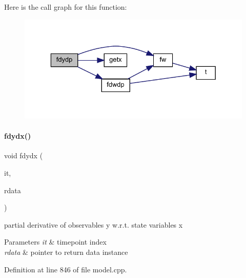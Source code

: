 Here is the call graph for this function\+:
\nopagebreak
\begin{figure}[H]
\begin{center}
\leavevmode
\includegraphics[width=329pt]{classamici_1_1_model_a884ccb083130cb1af7ebe93f7a6d361a_cgraph}
\end{center}
\end{figure}
\mbox{\label{classamici_1_1_model_a3ec46e89aed7bd191fb21ac3e501edd2}} 
\paragraph{\texorpdfstring{fdydx()}{fdydx()}\hspace{0.1cm}{\footnotesize\ttfamily [1/2]}}
{\footnotesize\ttfamily void fdydx (\begin{DoxyParamCaption}\item[{const int}]{it,  }\item[{\mbox{\hyperlink{classamici_1_1_return_data}{Return\+Data}} $\ast$}]{rdata }\end{DoxyParamCaption})}

partial derivative of observables y w.\+r.\+t. state variables x 
\begin{DoxyParams}{Parameters}
{\em it} & timepoint index \\
\hline
{\em rdata} & pointer to return data instance \\
\hline
\end{DoxyParams}


Definition at line 846 of file model.\+cpp.

